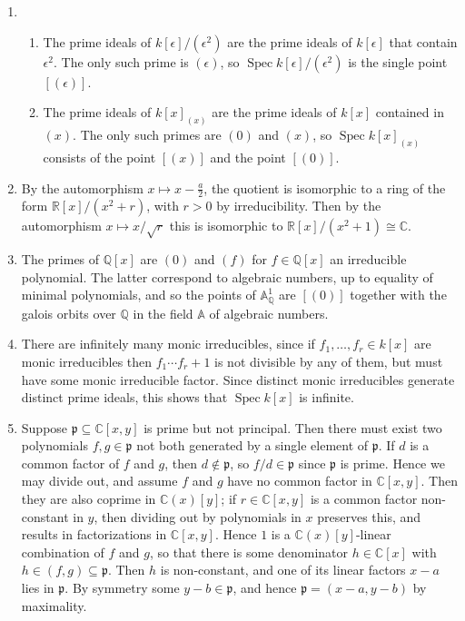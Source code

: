 \documentclass{report}
\newcommand{\p}{\mathfrak{p}}
\newcommand{\A}{\mathbb{A}}
\newcommand{\Q}{\mathbb{Q}}
\newcommand{\R}{\mathbb{R}}
\newcommand{\C}{\mathbb{C}}
\DeclareMathOperator{\Spec}{Spec}
\begin{document}
\begin{enumerate}[label=\textbf{3.2.\Alph*.}]
	\item
	      \begin{enumerate}[label=(\alph*)]
		      \item The prime ideals of $k[\epsilon]/(\epsilon^2)$ are the prime
		            ideals of $k[\epsilon]$ that contain $\epsilon^2$. The only such
		            prime is $(\epsilon)$, so $\Spec k[\epsilon]/(\epsilon^2)$ is
		            the single point $[(\epsilon)]$.

		      \item The prime ideals of $k[x]_{(x)}$ are the prime ideals of
		            $k[x]$ contained in $(x)$. The only such primes are $(0)$ and
		            $(x)$, so $\Spec k[x]_{(x)}$ consists of the point $[(x)]$
		            and the point $[(0)]$.
	      \end{enumerate}

	\item By the automorphism $x\mapsto x-\frac{a}{2}$, the quotient is
	      isomorphic to a ring of the form $\R[x]/(x^2+r)$, with $r>0$ by
	      irreducibility. Then by the automorphism $x\mapsto x/\sqrt{r}$ this is
	      isomorphic to $\R[x]/(x^2+1)\cong\C$.

	\item The primes of $\Q[x]$ are $(0)$ and $(f)$ for $f\in\Q[x]$ an
	      irreducible polynomial. The latter correspond to algebraic numbers, up
	      to equality of minimal polynomials, and so the points of $\A^1_\Q$ are
	      $[(0)]$ together with the galois orbits over $\Q$ in the field $\A$ of
	      algebraic numbers.

	\item There are infinitely many monic irreducibles, since if
	      $f_1,\ldots,f_r\in k[x]$ are monic irreducibles then $f_1\cdots f_r+1$
	      is not divisible by any of them, but must have some monic irreducible
	      factor. Since distinct monic irreducibles generate distinct prime ideals,
	      this shows that $\Spec k[x]$ is infinite.

	\item Suppose $\p\subseteq\C[x,y]$ is prime but not principal. Then there
	      must exist two polynomials $f,g\in\p$ not both generated by a single
	      element of $\p$. If $d$ is a common factor of $f$ and $g$, then
	      $d\notin\p$, so $f/d\in\p$ since $\p$ is prime. Hence we may divide out,
	      and assume $f$ and $g$ have no common factor in $\C[x,y]$. Then they are
	      also coprime in $\C(x)[y]$; if $r\in\C[x,y]$ is a common factor
	      non-constant in $y$, then dividing out by polynomials in $x$ preserves
	      this, and results in factorizations in $\C[x,y]$. Hence $1$ is a
	      $\C(x)[y]$-linear combination of $f$ and $g$, so that there is some
	      denominator $h\in\C[x]$ with $h\in(f,g)\subseteq\p$. Then $h$ is
	      non-constant, and one of its linear factors $x-a$ lies in $\p$. By
	      symmetry some $y-b\in\p$, and hence $\p=(x-a,y-b)$ by maximality.


\end{enumerate}
\end{document}
